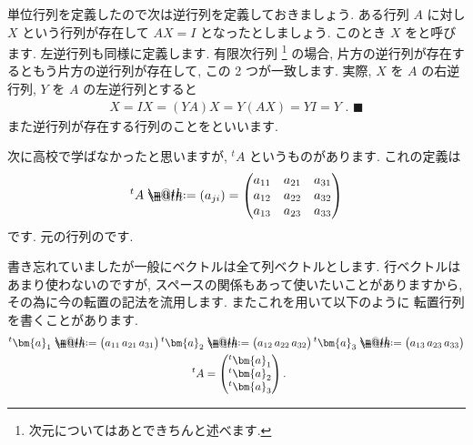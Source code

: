 \documentclass[openany, a4paper, oneside]{jsbook}
\makeatletter
\newcommand*{\defeq}{\mathrel{\rlap{%
\raisebox{0.3ex}{$\m@th\cdot$}}%
\raisebox{-0.3ex}{$\m@th\cdot$}}%
=}
\theoremstyle{break}
\theoremstyle{breakdefn}
\makeatother
\begin{document}
単位行列を定義したので次は逆行列を定義しておきましょう.
ある行列 $A$ に対し $X$ という行列が存在して $AX = I$ となったとしましょう. このとき $X$ をと呼びます.
左逆行列も同様に定義します. 有限次行列 \footnote{次元についてはあとできちんと述べます.
 }
の場合, 片方の逆行列が存在するともう片方の逆行列が存在して, この 2 つが一致します.
実際,  $X$ を $A$ の右逆行列,  $Y$ を $A$ の左逆行列とすると
    \begin{align}
        X = IX = (Y A) X = Y (A X) = Y I = Y \,\, . \,\, \blacksquare
    \end{align}
また逆行列が存在する行列のことをといいます.

次に高校で学ばなかったと思いますが,  ${^t}A$ というものがあります. これの定義は
    \begin{align}
        {^t}A \defeq (a_{j i})
        = \begin{pmatrix}
            a_{11} & a_{21} & a_{31} \\
            a_{12} & a_{22} & a_{32} \\
            a_{13} & a_{23} & a_{33}
        \end{pmatrix}
    \end{align}
です. 元の行列のです.

書き忘れていましたが一般にベクトルは全て列ベクトルとします. 行ベクトルはあまり使わないのですが,
スペースの関係もあって使いたいことがありますから, その為に今の転置の記法を流用します. またこれを用いて以下のように
転置行列を書くことがあります.
    \begin{align}
        {^t}\bm{a}_{1} \defeq \begin{pmatrix}  a_{11} \, a_{21} \, a_{31} \end{pmatrix}
        {^t}\bm{a}_{2} &\defeq \begin{pmatrix}  a_{12} \, a_{22} \, a_{32} \end{pmatrix}
        {^t}\bm{a}_{3} \defeq \begin{pmatrix}  a_{13} \, a_{23} \, a_{33} \end{pmatrix} \\
        {^t}A &= \begin{pmatrix} {^t}\bm{a}_{1} \\ {^t}\bm{a}_{2} \\ {^t}\bm{a}_{3}\end{pmatrix} .
    \end{align}
\end{document}
